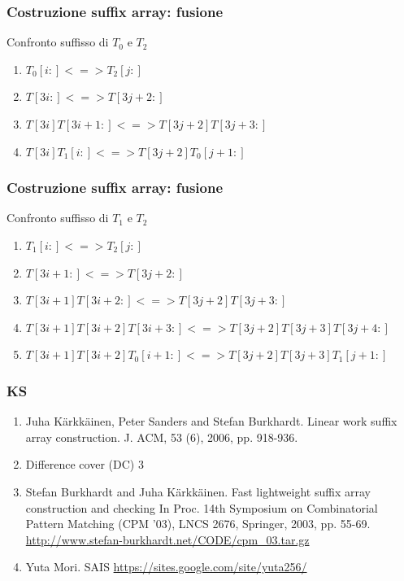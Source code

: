\begin{frame}
\frametitle{Costruzione suffix array: fusione}
Confronto suffisso di $T_{0}$ e $T_{2}$
\begin{enumerate}
\item
$T_{0}[i:] <=> T_{2}[j:]$
\item
$T[3i:] <=> T[3j+2:]$
\item
$T[3i]T[3i+1:] <=> T[3j+2]T[3j+3:]$
\item
$T[3i]T_{1}[i:] <=> T[3j+2]T_{0}[j+1:]$
\end{enumerate}
\end{frame}



\begin{frame}
\frametitle{Costruzione suffix array: fusione}
Confronto suffisso di $T_{1}$ e $T_{2}$
\begin{enumerate}
\item
$T_{1}[i:] <=> T_{2}[j:]$
\item
$T[3i+1:] <=> T[3j+2:]$
\item
$T[3i+1]T[3i+2:] <=> T[3j+2]T[3j+3:]$
\item
$T[3i+1]T[3i+2]T[3i+3:] <=> T[3j+2]T[3j+3]T[3j+4:]$
\item
$T[3i+1]T[3i+2]T_{0}[i+1:] <=> T[3j+2]T[3j+3]T_{1}[j+1:]$
\end{enumerate}
\end{frame}

\begin{frame}
\frametitle{KS}
\begin{enumerate}
\item
Juha Kärkkäinen, Peter Sanders and Stefan Burkhardt.
Linear work suffix array construction. J. ACM, 53 (6), 2006, pp. 918-936.
\item
Difference cover (DC) 3
\item
Stefan Burkhardt and Juha Kärkkäinen.
Fast lightweight suffix array construction and checking
In Proc. 14th Symposium on Combinatorial Pattern Matching (CPM '03), LNCS 2676,
Springer, 2003, pp. 55-69. \url{http://www.stefan-burkhardt.net/CODE/cpm_03.tar.gz}
\item
Yuta Mori.
SAIS \url{https://sites.google.com/site/yuta256/}
\end{enumerate}
\end{frame}


